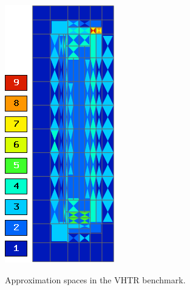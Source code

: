 \begin{figure}[!ht]
{  \includegraphics[scale=.36]{vhtr/mesh_g3.png}
}
\hspace{2em}
  \caption[Approximation spaces in the VHTR benchmark]{Approximation spaces in the VHTR benchmark.}
  \label{fig:72} 
\end{figure}

